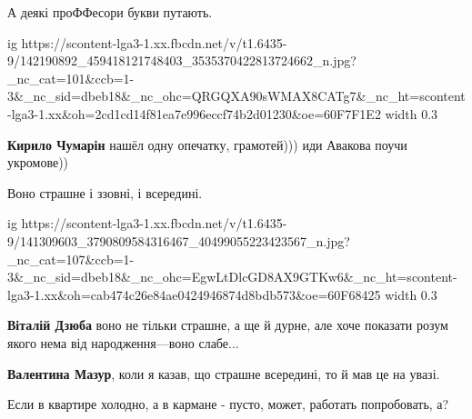 А деякі проФФесори букви путають.

\ifcmt
  ig https://scontent-lga3-1.xx.fbcdn.net/v/t1.6435-9/142190892_459418121748403_3535370422813724662_n.jpg?_nc_cat=101&ccb=1-3&_nc_sid=dbeb18&_nc_ohc=QRGQXA90sWMAX8CATg7&_nc_ht=scontent-lga3-1.xx&oh=2cd1cd14f81ea7e996eccf74b2d01230&oe=60F7F1E2
  width 0.3
\fi

\begin{itemize}

\textbf{Кирило Чумарін} нашёл одну опечатку, грамотей))) иди Авакова поучи укромове))
\end{itemize}


Воно страшне і ззовні, і всередині.

\ifcmt
  ig https://scontent-lga3-1.xx.fbcdn.net/v/t1.6435-9/141309603_3790809584316467_40499055223423567_n.jpg?_nc_cat=107&ccb=1-3&_nc_sid=dbeb18&_nc_ohc=EgwLtDlcGD8AX9GTKw6&_nc_ht=scontent-lga3-1.xx&oh=cab474c26e84ae0424946874d8bdb573&oe=60F68425
  width 0.3
\fi

\begin{itemize}

\textbf{Віталій Дзюба} воно не тільки страшне, а ще й дурне, але хоче показати розум якого нема від народження---воно слабе...


\textbf{Валентина Мазур}, коли я казав, що страшне всередині, то й мав це на увазі.
\end{itemize}


Если в квартире холодно, а в кармане - пусто, может, работать попробовать, а?

